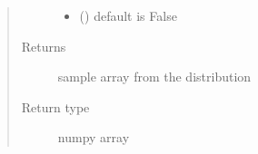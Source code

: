 \documentclass[letterpaper,10pt,english]{sphinxmanual}
\begin{document}
\begin{fulllineitems}
\begin{quote}
\begin{description}
\begin{itemize}
\item {} 
\sphinxAtStartPar
{} () \textendash{} default is False

\end{itemize}

\item[{Returns}] \leavevmode
\sphinxAtStartPar
sample array from the distribution

\item[{Return type}] \leavevmode
\sphinxAtStartPar
numpy array

\end{description}\end{quote}

\end{fulllineitems}

\end{document}
